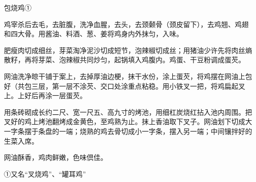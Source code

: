 \begin{recipe}{包烧鸡①}

\ingredients



\cooking

\step 鸡宰杀后去毛，去脏腹，洗净血腥，去头，去颈颡骨（颈皮留下），去鸡翘、鸡翅和四大骨。用酱油、料酒、葱、姜将鸡身内外抹匀，入味。

\step 肥瘦肉切成细丝，芽菜淘净泥沙切成短节，泡辣椒切成丝；用猪油少许先将肉丝熵散籽，再将芽菜、泡辣椒共同炒匀，起锅填入鸡腹内。鸡蛋、干豆粉调成蛋芡。

\step 网油洗净晾干铺于案上，去掉厚油边梗，抹干水份，涂上蛋芡，将鸡摆在网油上包好（共包三层，第一层不涂芡、交口处涂重点粘稳。用小铁叉一把，将鸡扁起叉上。上好后再涂一层蛋芡。

\step 用条砖砌成长约二尺、宽一尺五、高九寸的烤池，用细杠炭烧红拈入池内周围。把叉好的鸡上烤池翻烤成金黄色，至鸡熟为止。抹上香油取下叉子。网油划下切成大一字条摆于条盘的一端；烧熟的鸡去骨切成小一字条，摆入另一端；中间镶拌好的生菜入席。

\notes

网油酥香，鸡肉鲜嫩，色味倶佳。

①又名“叉烧鸡”、“罐耳鸡”

\end{recipe}

